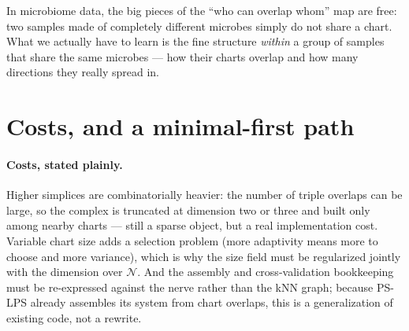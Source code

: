 \documentclass[11pt]{article}
\theoremstyle{definition}
\newcommand{\nerve}{\mathcal{N}}
\begin{document}
\begin{plain}
In microbiome data, the big pieces of the ``who can overlap whom'' map are free:
two samples made of completely different microbes simply do not share a chart.
What we actually have to learn is the fine structure \emph{within} a group of
samples that share the same microbes --- how their charts overlap and how many
directions they really spread in.
\end{plain}

\section{Costs, and a minimal-first path}\label{sec:plan}

\paragraph{Costs, stated plainly.} Higher simplices are combinatorially heavier:
the number of triple overlaps can be large, so the complex is truncated at
dimension two or three and built only among nearby charts --- still a sparse object,
but a real implementation cost. Variable chart size adds a selection problem (more
adaptivity means more to choose and more variance), which is why the size field
must be regularized jointly with the dimension over $\nerve$. And the assembly and
cross-validation bookkeeping must be re-expressed against the nerve rather than the
kNN graph; because PS-LPS already assembles its system from chart overlaps, this is
a generalization of existing code, not a rewrite.
\end{document}
